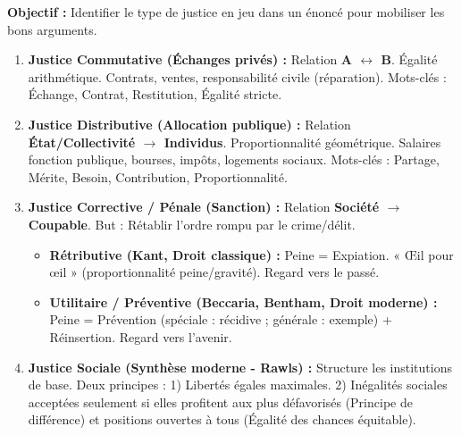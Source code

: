 \documentclass[11pt]{article}
\newcommand{\cle}[1]{{\popxbold\color{popdark}#1}}
\begin{document}
\begin{methode}
    \textbf{Objectif :} Identifier le type de justice en jeu dans un énoncé pour mobiliser les bons arguments.
    \begin{enumerate}
        \item \textbf{Justice Commutative (Échanges privés) :} Relation \textbf{A $\leftrightarrow$ B}. Égalité arithmétique. Contrats, ventes, responsabilité civile (réparation). Mots-clés : \cle{Échange}, \cle{Contrat}, \cle{Restitution}, \cle{Égalité stricte}.
        \item \textbf{Justice Distributive (Allocation publique) :} Relation \textbf{État/Collectivité $\rightarrow$ Individus}. Proportionnalité géométrique. Salaires fonction publique, bourses, impôts, logements sociaux. Mots-clés : \cle{Partage}, \cle{Mérite}, \cle{Besoin}, \cle{Contribution}, \cle{Proportionnalité}.
        \item \textbf{Justice Corrective / Pénale (Sanction) :} Relation \textbf{Société $\rightarrow$ Coupable}. But : \cle{Rétablir l'ordre} rompu par le crime/délit.
            \begin{itemize}
                \item \textbf{Rétributive (Kant, Droit classique) :} Peine = \cle{Expiation}. « Œil pour œil » (proportionnalité peine/gravité). Regard vers le passé.
                \item \textbf{Utilitaire / Préventive (Beccaria, Bentham, Droit moderne) :} Peine = \cle{Prévention} (spéciale : récidive ; générale : exemple) + \cle{Réinsertion}. Regard vers l'avenir.
            \end{itemize}
        \item \textbf{Justice Sociale (Synthèse moderne - Rawls) :} Structure les institutions de base. Deux principes : 1) Libertés égales maximales. 2) Inégalités sociales acceptées seulement si elles profitent aux plus défavorisés (\cle{Principe de différence}) et positions ouvertes à tous (\cle{Égalité des chances équitable}).
    \end{enumerate}
\end{methode}
\end{document}
